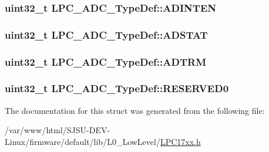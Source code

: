 \subsubsection[{\texorpdfstring{A\+D\+I\+N\+T\+EN}{ADINTEN}}]{ uint32\+\_\+t L\+P\+C\+\_\+\+A\+D\+C\+\_\+\+Type\+Def\+::\+A\+D\+I\+N\+T\+EN}\hypertarget{structLPC__ADC__TypeDef_a3867c156abd33ddafeb3b51e7b1da97c}{}\label{structLPC__ADC__TypeDef_a3867c156abd33ddafeb3b51e7b1da97c}
\subsubsection[{\texorpdfstring{A\+D\+S\+T\+AT}{ADSTAT}}]{ uint32\+\_\+t L\+P\+C\+\_\+\+A\+D\+C\+\_\+\+Type\+Def\+::\+A\+D\+S\+T\+AT}\hypertarget{structLPC__ADC__TypeDef_a731ad153d3d54d3ba2677eecb30c3097}{}\label{structLPC__ADC__TypeDef_a731ad153d3d54d3ba2677eecb30c3097}
\subsubsection[{\texorpdfstring{A\+D\+T\+RM}{ADTRM}}]{ uint32\+\_\+t L\+P\+C\+\_\+\+A\+D\+C\+\_\+\+Type\+Def\+::\+A\+D\+T\+RM}\hypertarget{structLPC__ADC__TypeDef_aa66f6667bdd2b2110f2e25e7c8da94a9}{}\label{structLPC__ADC__TypeDef_aa66f6667bdd2b2110f2e25e7c8da94a9}
\subsubsection[{\texorpdfstring{R\+E\+S\+E\+R\+V\+E\+D0}{RESERVED0}}]{\setlength{\rightskip}{0pt plus 5cm}uint32\+\_\+t L\+P\+C\+\_\+\+A\+D\+C\+\_\+\+Type\+Def\+::\+R\+E\+S\+E\+R\+V\+E\+D0}\hypertarget{structLPC__ADC__TypeDef_a40cf73fb4dbf0486e17c338b59481012}{}\label{structLPC__ADC__TypeDef_a40cf73fb4dbf0486e17c338b59481012}


The documentation for this struct was generated from the following file\+:\begin{DoxyCompactItemize}
\item 
/var/www/html/\+S\+J\+S\+U-\/\+D\+E\+V-\/\+Linux/firmware/default/lib/\+L0\+\_\+\+Low\+Level/\hyperlink{LPC17xx_8h}{L\+P\+C17xx.\+h}\end{DoxyCompactItemize}
